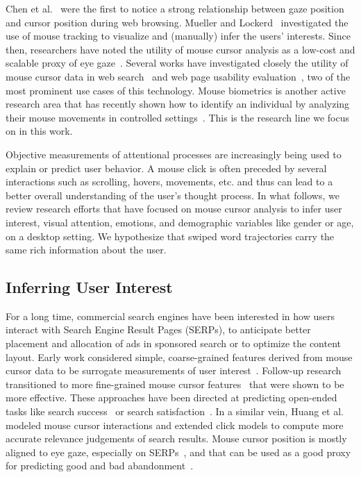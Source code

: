 \documentclass[sn-mathphys, pdflatex]{sn-jnl}
\begin{document}
Chen et al.~\cite{Chen_2001} were the first to notice a strong relationship between gaze position and cursor position during web browsing.
Mueller and Lockerd~\cite{Mueller01_cheese} investigated the use of mouse tracking to visualize and (manually) infer the users' interests.
Since then, researchers have noted the utility of mouse cursor analysis
as a low-cost and scalable proxy of eye gaze~\cite{Huang12_search, Huang12_align, Navalpakkam13_layout}.
Several works have investigated closely the utility of mouse cursor data in web search~\cite{Arapakis16_dds, Chen17_satisfaction, Liu15_opinions}
and web page usability evaluation~\cite{Arroyo06_usab, Atterer06_move, Leiva11_adapt},
two of the most prominent use cases of this technology.
Mouse biometrics is another active research area that has recently shown how to identify an individual
by analyzing their mouse movements in controlled settings~\cite{Kratky18_biom, Lu17_biom}.
This is the research line we focus on in this work.

Objective measurements of attentional processes are increasingly being used to explain or predict user behavior.
A mouse click is often preceded by several interactions such as scrolling, hovers, movements, etc.
and thus can lead to a better overall understanding of the user's thought process.
%
In what follows, we review research efforts that have focused on mouse cursor analysis
to infer user interest, visual attention, emotions, and demographic variables like gender or age, on a desktop setting.
We hypothesize that swiped word trajectories carry the same rich information about the user.

\subsection{Inferring User Interest}
\label{sec:interest}

For a long time, commercial search engines have been interested in how users interact with Search Engine Result Pages (SERPs),
to anticipate better placement and allocation of ads in sponsored search or to optimize the content layout.
Early work considered simple, coarse-grained features derived from mouse cursor data
to be surrogate measurements of user interest~\cite{Claypool01_iii, Shapira06_ii}.
Follow-up research transitioned to more fine-grained mouse cursor features~\cite{Guo08_query, Guo10_buy}
that were shown to be more effective.
These approaches have been directed at predicting open-ended tasks
like search success~\cite{Guo12_success} or search satisfaction~\cite{Liu15_opinions}.
In a similar vein, Huang et al.~\cite{Huang12_search, Huang11_clicks}
modeled mouse cursor interactions and extended click models to compute more accurate relevance judgements of search results.
Mouse cursor position is mostly aligned to eye gaze,
especially on SERPs~\cite{Guo12_rel, Speicher13_rel},
and that can be used as a good proxy for predicting good and bad abandonment~\cite{Diriye12_leaving}.
\end{document}

